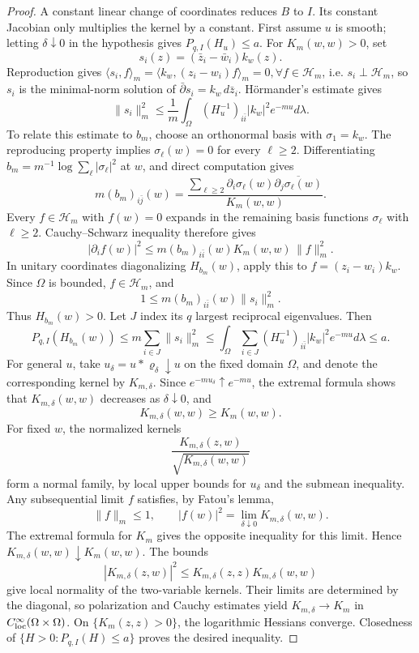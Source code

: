 \documentclass[reqno]{amsart}
\numberwithin{equation}{section}
\theoremstyle{definition}
\begin{document}
\begin{proof}
A constant linear change of coordinates reduces $B$ to $I$. Its constant Jacobian only multiplies the kernel by a constant. First assume $u$ is smooth; letting $\delta\downarrow0$ in the
hypothesis gives $P_{q,I}(H_u)\leq a$.  For $K_m(w,w)>0$, set
\[
 s_i(z)=(\bar z_i-\bar w_i)k_w(z).
\]
Reproduction gives $\langle s_i,f\rangle_m
=\langle k_w,(z_i-w_i)f\rangle_m=0, \forall f\in\mathscr H_m$, i.e. $s_i\perp\mathscr H_m$, so $s_i$ is the minimal-norm solution of $\bar\partial s_i=k_w\,d\bar z_i$. H\"ormander's estimate gives
\begin{equation}
 \|s_i\|_m^2\le\frac1m\int_\Omega(H_u^{-1})_{i\bar i}|k_w|^2e^{-mu}d\lambda.
\end{equation}
To relate this estimate to $b_m$, choose an orthonormal basis
with $\sigma_1=k_w$. The reproducing property implies
$\sigma_\ell(w)=0$ for every $\ell\ge2$.
Differentiating $b_m=m^{-1}\log\sum_\ell|\sigma_\ell|^2$ at
$w$, and direct computation gives 
\begin{equation}
 m(b_m)_{i\bar j}(w)=
 \frac{\sum_{\ell\ge2}\partial_i\sigma_\ell(w)\overline{\partial_j\sigma_\ell(w)}}{K_m(w,w)}.
\end{equation}
Every $f\in\mathscr H_m$ with $f(w)=0$ expands in the
remaining basis functions $\sigma_\ell$ with $\ell\ge 2$. Cauchy--Schwarz inequality therefore gives
\[
|\partial_i f(w)|^2
\le m(b_m)_{i\bar i}(w)K_m(w,w)\,\|f\|_m^2.
\]
In unitary coordinates diagonalizing $H_{b_m}(w)$, apply this to $f=(z_i-w_i)k_w$. Since $\Omega$ is bounded, $f\in\mathscr H_m$, and
\[
 1\le m(b_m)_{i\bar i}(w)\|s_i\|_m^2.
\]
Thus $H_{b_m}(w)>0$. Let $J$ index its $q$ largest reciprocal eigenvalues. Then
\[
 P_{q,I}(H_{b_m}(w))
 \le m\sum_{i\in J}\|s_i\|_m^2
 \le\int_\Omega\sum_{i\in J}(H_u^{-1})_{i\bar i}|k_w|^2e^{-mu}d\lambda\le a.
\]
For general $u$, take $u_\delta=u*\varrho_\delta\downarrow u$
on the fixed domain $\Omega$, and denote the corresponding
kernel by $K_{m,\delta}$.
Since $e^{-mu_\delta}\uparrow e^{-mu}$, the extremal formula
shows that $K_{m,\delta}(w,w)$ decreases as
$\delta\downarrow0$, and
\[
K_{m,\delta}(w,w)\ge K_m(w,w).
\]
For fixed $w$, the normalized kernels
\[
\frac{K_{m,\delta}(z,w)}{\sqrt{K_{m,\delta}(w,w)}}
\]
form a normal family, by local upper bounds for $u_\delta$
and the submean inequality. Any subsequential limit $f$
satisfies, by Fatou's lemma,
\[
\|f\|_m\le1,\qquad
|f(w)|^2=\lim_{\delta\downarrow0}K_{m,\delta}(w,w).
\]
The extremal formula for $K_m$ gives the opposite inequality
for this limit. Hence $K_{m,\delta}(w,w)\downarrow K_m(w,w)$.
The bounds
\[
|K_{m,\delta}(z,w)|^2
\le K_{m,\delta}(z,z)K_{m,\delta}(w,w)
\]
give local normality of the two-variable kernels.
Their limits are determined by the diagonal, so polarization and
Cauchy estimates yield $K_{m,\delta}\to K_m$ in
$C^\infty_{\rm loc}(\Omega\times\Omega)$.
On $\{K_m(z,z)>0\}$, the logarithmic Hessians converge.
Closedness of $\{H>0:P_{q,I}(H)\le a\}$ proves the desired inequality.


\end{proof}
\end{document}
